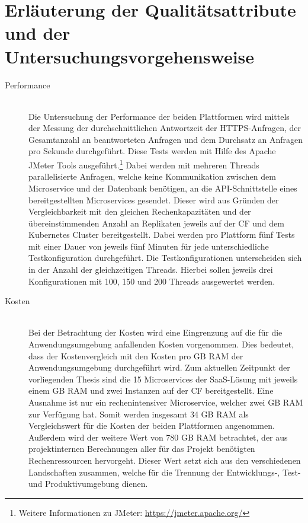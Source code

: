 \section{Erläuterung der Qualitätsattribute und der Untersuchungsvorgehensweise}
\label{kapitel_merkmale_vorgehensweise}
\begin{description}
	\item[Performance] \hfill \\
	Die Untersuchung der Performance der beiden Plattformen wird mittels der Messung der durchschnittlichen Antwortzeit der \ac{HTTPS}-Anfragen, der Gesamtanzahl an beantworteten Anfragen und dem Durchsatz an Anfragen pro Sekunde durchgeführt. Diese Tests werden mit Hilfe des Apache JMeter Tools ausgeführt.\footnote{Weitere Informationen zu JMeter: \url{https://jmeter.apache.org/}} Dabei werden mit mehreren Threads parallelisierte Anfragen, welche keine Kommunikation zwischen dem Microservice und der Datenbank benötigen, an die \ac{API}-Schnittstelle eines bereitgestellten Microservices gesendet. Dieser wird aus Gründen der Vergleichbarkeit mit den gleichen Rechenkapazitäten und der übereinstimmenden Anzahl an Replikaten jeweils auf der \ac{CF} und dem Kubernetes Cluster bereitgestellt.
	Dabei werden pro Plattform fünf Tests mit einer Dauer von jeweils fünf Minuten für jede unterschiedliche Testkonfiguration durchgeführt. Die Testkonfigurationen unterscheiden sich in der Anzahl der gleichzeitigen Threads. Hierbei sollen jeweils drei Konfigurationen mit 100, 150 und 200 Threads ausgewertet werden.
	\item[Kosten] \hfill \\
	Bei der Betrachtung der Kosten wird eine Eingrenzung auf die für die Anwendungsumgebung anfallenden Kosten vorgenommen. Dies bedeutet, dass der Kostenvergleich mit den Kosten pro \ac{GB} \ac{RAM} der Anwendungsumgebung	durchgeführt wird. Zum aktuellen Zeitpunkt der vorliegenden Thesis sind die 15 Microservices der \ac{SaaS}-Lösung mit jeweils einem \ac{GB} \ac{RAM} und zwei Instanzen auf der \ac{CF} bereitgestellt. Eine Ausnahme ist nur ein rechenintensiver Microservice, welcher zwei \ac{GB} \ac{RAM} zur Verfügung hat. Somit werden insgesamt 34 \ac{GB} \ac{RAM} als Vergleichswert für die Kosten der beiden Plattformen angenommen. Außerdem wird der weitere Wert von 780 \ac{GB} \ac{RAM} betrachtet, der aus projektinternen Berechnungen aller für das Projekt benötigten Rechenressourcen hervorgeht. Dieser Wert setzt sich aus den verschiedenen Landschaften zusammen, welche für die Trennung der Entwicklungs-, Test- und Produktivumgebung dienen.\\

\end{description}
